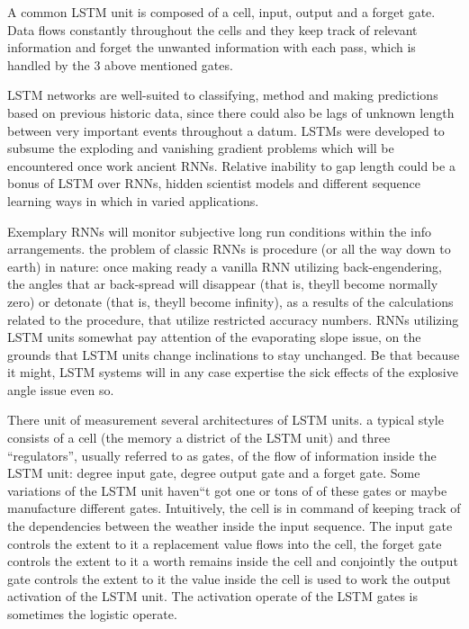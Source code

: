 \documentclass[BTech]{srmuthesis}
\begin{document}
A common LSTM unit is composed of a cell, input, output and a forget gate. Data flows constantly throughout the cells and they keep track of relevant information and forget the unwanted information with each pass, which is handled by the 3 above mentioned gates. 

LSTM networks are well-suited to classifying, method and making predictions based on previous historic data, since there could also be lags of unknown length between very important events throughout a datum. LSTMs were developed to subsume the exploding and vanishing gradient problems which will be encountered once work ancient RNNs. Relative inability to gap length could be a bonus of LSTM over RNNs, hidden scientist models and different sequence learning ways in which in varied applications. 

Exemplary RNNs will monitor subjective long run conditions within the info arrangements. the problem of classic RNNs is procedure (or all the way down to earth) in nature: once making ready a vanilla RNN utilizing back-engendering, the angles that ar back-spread will disappear (that is, they\textquotesingle ll become normally zero) or detonate (that is, they\textquotesingle ll become infinity), as a results of the calculations related to the procedure, that utilize restricted accuracy numbers. RNNs utilizing LSTM units somewhat pay attention of the evaporating slope issue, on the grounds that LSTM units change inclinations to stay unchanged. Be that because it might, LSTM systems will in any case expertise the sick effects of the explosive angle issue even so. 

There unit of measurement several architectures of LSTM units. a typical style consists of a cell (the memory a district of the LSTM unit) and three ``regulators'', usually referred to as gates, of the flow of information inside the LSTM unit: degree input gate, degree output gate and a forget gate. Some variations of the LSTM unit haven\textquotedblleft t got one or tons of of these gates or maybe manufacture different gates. Intuitively, the cell is in command of keeping track of the dependencies between the weather inside the input sequence. The input gate controls the extent to it a replacement value flows into the cell, the forget gate controls the extent to it a worth remains inside the cell and conjointly the output gate controls the extent to it the value inside the cell is used to work the output activation of the LSTM unit. The activation operate of the LSTM gates is sometimes the logistic operate. 
\end{document}
